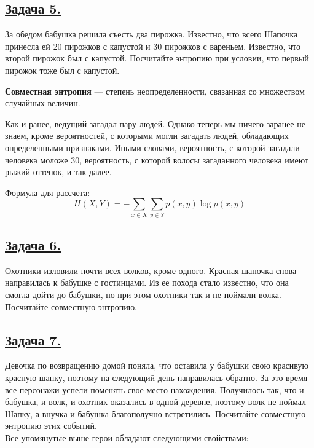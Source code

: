 \subsection*{\hyperref[sec:sol_problem5]{Задача 5.}}\label{sec:problem5} За обедом бабушка решила съесть два пирожка. Известно, что всего Шапочка принесла ей 20 пирожков с капустой и 30 пирожков с вареньем. Известно, что второй пирожок был с капустой. Посчитайте энтропию при условии, что первый пирожок тоже был с капустой.

\begin{siderules}
    \textbf{Совместная энтропия} --- степень неопределенности, связанная со множеством случайных величин.
\end{siderules}

Как и ранее, ведущий загадал пару людей. Однако теперь мы ничего заранее не знаем, кроме вероятностей, с которыми могли загадать людей, обладающих определенными признаками. Иными словами, вероятность, с которой загадали человека моложе 30, вероятность, с которой волосы загаданного человека имеют рыжий оттенок, и так далее.

Формула для рассчета:
\[H(X, Y)=-\sum\limits_{x\in X}\sum\limits_{y\in Y} p(x, y)\log p(x ,y) \]

\subsection*{\hyperref[sec:sol_problem6]{Задача 6.}}\label{sec:problem6}Охотники изловили почти всех волков, кроме одного. Красная шапочка снова направилась к бабушке с гостинцами. Из ее похода стало известно, что она смогла дойти до бабушки, но при этом охотники так и не поймали волка. Посчитайте совместную энтропию. 

\subsection*{\hyperref[sec:sol_problem7]{Задача 7.}}\label{sec:problem7} Девочка по возвращению домой поняла, что оставила у бабушки свою красивую красную шапку, поэтому на следующий день направилась обратно. За это время все персонажи успели поменять свое место нахождения. Получилось так, что и бабушка, и волк, и охотник оказались в одной деревне, поэтому волк не поймал Шапку, а внучка и бабушка благополучно встретились. Посчитайте совместную энтропию этих событий. \\

Все упомянутые выше герои обладают следующими свойствами:

